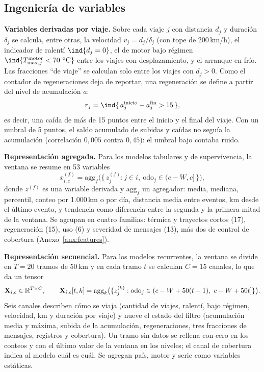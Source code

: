 \subsection{Ingeniería de variables}
\label{sec:features}

\textbf{Variables derivadas por viaje.} Sobre cada viaje $j$ con distancia $d_j$ y duración $\delta_j$ se calcula, entre
otras, la velocidad $v_j = d_j/\delta_j$ (con tope de 200\,km/h), el indicador de ralentí $\ind\{d_j = 0\}$, el de motor bajo
régimen $\ind\{T^{\mathrm{motor}}_{\max,j} < 70\ {}^{\circ}\mathrm{C}\}$ entre los viajes con desplazamiento, y el arranque en frío.
Las fracciones ``de viaje'' se calculan solo entre los viajes con $d_j > 0$. Como el contador de regeneraciones deja de
reportar, una regeneración se define a partir del nivel de acumulación $a$:
\begin{equation}
  r_j = \ind\{\, a_{j}^{\mathrm{inicio}} - a_{j}^{\mathrm{fin}} > 15 \,\},
  \label{eq:regen}
\end{equation}
es decir, una caída de más de 15 puntos entre el inicio y el final del viaje. Con un umbral de 5 puntos, el saldo acumulado de
subidas y caídas no seguía la acumulación (correlación $0{,}005$ contra $0{,}45$): el umbral bajo contaba ruido.

\textbf{Representación agregada.} Para los modelos tabulares y de supervivencia, la ventana se resume en 53 variables
\begin{equation}
  x^{(f)}_{i,c} = \mathrm{agg}_f\big(\{\, z^{(f)}_j : j \in i,\ \mathrm{odo}_j \in (c-W, c] \,\}\big),
  \label{eq:agregado}
\end{equation}
donde $z^{(f)}$ es una variable derivada y $\mathrm{agg}_f$ un agregador: media, mediana, percentil, conteo por 1.000\,km o por
día, distancia media entre eventos, km desde el último evento, y tendencia como diferencia entre la segunda y la primera
mitad de la ventana. Se agrupan en cuatro familias: térmica y trayectos cortos (17), regeneración (15), uso (6) y severidad
de mensajes (13), más dos de control de cobertura (Anexo~\ref{anx:features}).

\textbf{Representación secuencial.} Para los modelos recurrentes, la ventana se divide en $T = 20$ tramos de 50\,km y en
cada tramo $t$ se calculan $C = 15$ canales, lo que da un tensor
\begin{equation}
  \mathbf{X}_{i,c} \in \mathbb{R}^{T \times C}, \qquad
  \mathbf{X}_{i,c}[t,k] = \mathrm{agg}_k\big(\{ z^{(k)}_j : \mathrm{odo}_j \in (c - W + 50(t-1),\ c - W + 50t] \}\big).
  \label{eq:secuencia}
\end{equation}
Seis canales describen cómo se viaja (cantidad de viajes, ralentí, bajo régimen, velocidad, km y duración por viaje) y nueve
el estado del filtro (acumulación media y máxima, subida de la acumulación, regeneraciones, tres fracciones de mensajes,
registros y cobertura). Un tramo sin datos se rellena con cero en los conteos y con el último valor de la ventana en los
niveles; el canal de cobertura indica al modelo cuál es cuál. Se agregan país, motor y serie como variables estáticas.

